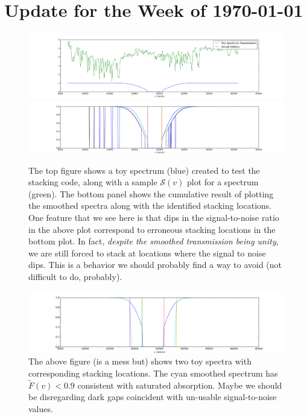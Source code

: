 \documentclass[11pt]{article}
\begin{document}
\section*{Update for the Week of \today}

\begin{figure}[h]
  \centering
  \includegraphics[width=18cm]{ToyFlux_RealNoise.png}
  \includegraphics[width=18cm]{ToySpectrum_StackingLocations.png}
  \caption{The top figure shows a toy spectrum (blue) created to test the stacking code, along with a sample $\mathcal{S}(v)$ plot for a spectrum (green). The bottom panel shows the cumulative result of plotting the smoothed spectra along with the identified stacking locations. One feature that we see here is that dips in the signal-to-noise ratio in the above plot correspond to erroneous stacking locations in the bottom plot. In fact, \textit{despite the smoothed transmission being unity}, we are still forced to stack at locations where the signal to noise dips. This is a behavior we should probably find a way to avoid (not difficult to do, probably).}
  \label{fig:todo}
\end{figure}

\begin{figure}[h]
  \centering
  \includegraphics[width=18cm]{ToySpectrum_StackingLocations_HiNoise.png}
  \caption{The above figure (is a mess but) shows two toy spectra with corresponding stacking locations. The cyan smoothed spectrum has $\tilde{F}(v) < 0.9$ consistent with saturated absorption. Maybe we should be disregarding dark gaps coincident with un-usable signal-to-noise values. }
  \label{fig:todo}
\end{figure}
\end{document}
